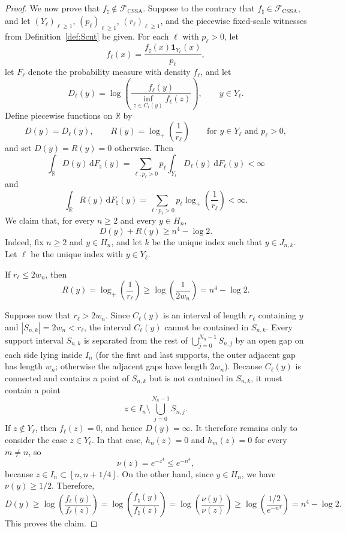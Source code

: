 \documentclass[11pt]{article}
\theoremstyle{definition}
\begin{document}
\begin{proof}
We now prove that $f_\natural\notin\mathcal F_{\mathrm{CSSA}}$. Suppose to the contrary that $f_\natural\in\mathcal F_{\mathrm{CSSA}}$, and let $(Y_\ell)_{\ell\ge1}$, $(p_\ell)_{\ell\ge1}$, $(r_\ell)_{\ell\ge1}$, and the piecewise fixed-scale witnesses from Definition~\ref{def:Scnt} be given. For each $\ell$ with $p_\ell>0$, let
\[
f_\ell(x)=\frac{f_\natural(x)\mathbf 1_{Y_\ell}(x)}{p_\ell},
\]
let $F_\ell$ denote the probability measure with density $f_\ell$, and let
\[
D_\ell(y)=\log\!\left(\frac{f_\ell(y)}{\inf_{z\in C_\ell(y)}f_\ell(z)}\right),
\qquad y\in Y_\ell.
\]
Define piecewise functions on $\mathbb{R}$ by
\[
D(y)=D_\ell(y),
\qquad
R(y)=\log_+\!\left(\frac{1}{r_\ell}\right)
\qquad \text{for } y\in Y_\ell \text{ and } p_\ell>0,
\]
and set $D(y)=R(y)=0$ otherwise. Then
\[
\int_{\mathbb{R}} D(y)\,\mathrm{d}F_\natural(y)
=\sum_{\ell:p_\ell>0} p_\ell\int_{Y_\ell} D_\ell(y)\,\mathrm{d}F_\ell(y)<\infty
\]
and
\[
\int_{\mathbb{R}} R(y)\,\mathrm{d}F_\natural(y)
=\sum_{\ell:p_\ell>0} p_\ell\log_+\!\left(\frac{1}{r_\ell}\right)<\infty.
\]
We claim that, for every $n\ge2$ and every $y\in H_n$,
\[
D(y)+R(y)\ge n^4-\log 2.
\]
Indeed, fix $n\ge2$ and $y\in H_n$, and let $k$ be the unique index such that $y\in J_{n,k}$. Let $\ell$ be the unique index with $y\in Y_\ell$.

If $r_\ell\le 2w_n$, then
\[
R(y)=\log_+\!\left(\frac{1}{r_\ell}\right)
\ge \log\!\left(\frac{1}{2w_n}\right)
= n^4-\log 2.
\]

Suppose now that $r_\ell>2w_n$. Since $C_\ell(y)$ is an interval of length $r_\ell$ containing $y$ and $|S_{n,k}|=2w_n<r_\ell$, the interval $C_\ell(y)$ cannot be contained in $S_{n,k}$. Every support interval $S_{n,k}$ is separated from the rest of $\bigcup_{j=0}^{N_n-1}S_{n,j}$ by an open gap on each side lying inside $I_n$ (for the first and last supports, the outer adjacent gap has length $w_n$; otherwise the adjacent gaps have length $2w_n$). Because $C_\ell(y)$ is connected and contains a point of $S_{n,k}$ but is not contained in $S_{n,k}$, it must contain a point
\[
z\in I_n\setminus \bigcup_{j=0}^{N_n-1} S_{n,j}.
\]
If $z\notin Y_\ell$, then $f_\ell(z)=0$, and hence $D(y)=\infty$. It therefore remains only to consider the case $z\in Y_\ell$. In that case, $h_n(z)=0$ and $h_m(z)=0$ for every $m\neq n$, so
\[
\nu(z)=e^{-z^4}\le e^{-n^4},
\]
because $z\in I_n\subset[n,n+1/4]$. On the other hand, since $y\in H_n$, we have $\nu(y)\ge1/2$. Therefore,
\[
D(y)
\ge \log\!\left(\frac{f_\ell(y)}{f_\ell(z)}\right)
=\log\!\left(\frac{f_\natural(y)}{f_\natural(z)}\right)
=\log\!\left(\frac{\nu(y)}{\nu(z)}\right)
\ge \log\!\left(\frac{1/2}{e^{-n^4}}\right)
= n^4-\log 2.
\]
This proves the claim.


\end{proof}
\end{document}
